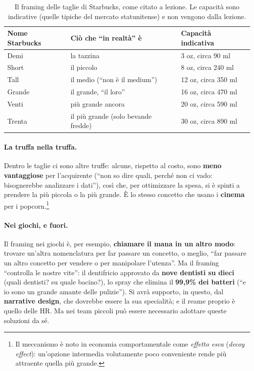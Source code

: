 \begin{table}[htbp]
  \centering
  \caption{Il framing delle taglie di Starbucks, come citato a lezione. Le
  capacità sono indicative (quelle tipiche del mercato statunitense) e non
  vengono dalla lezione.}
  \label{gd10:tab:starbucks}
  \small
  \begin{tabular}{@{}lll@{}}
    \toprule
    \textbf{Nome Starbucks} & \textbf{Ciò che ``in realtà'' è} &
      \textbf{Capacità indicativa} \\
    \midrule
    Demi & la tazzina & 3 oz, circa 90 ml \\
    Short & il piccolo & 8 oz, circa 240 ml \\
    Tall & il medio (``non è il medium'') & 12 oz, circa 350 ml \\
    Grande & il grande, ``il loro'' & 16 oz, circa 470 ml \\
    Venti & più grande ancora & 20 oz, circa 590 ml \\
    Trenta & il più grande (solo bevande fredde) & 30 oz, circa 890 ml \\
    \bottomrule
  \end{tabular}
\end{table}

\paragraph{La truffa nella truffa.} Dentro le taglie ci sono altre truffe:
alcune, rispetto al costo, sono \textbf{meno vantaggiose} per l'acquirente
(``non so dire quali, perché non ci vado: bisognerebbe analizzare i
dati''), così che, per ottimizzare la spesa, si è spinti a prendere la più
piccola o la più grande. È lo stesso concetto che usano i
\textbf{cinema} per i popcorn.\footnote{Il meccanismo è noto in economia
comportamentale come \emph{effetto esca} (\emph{decoy effect}): un'opzione
intermedia volutamente poco conveniente rende più attraente quella più
grande.}

\paragraph{Nei giochi, e fuori.} Il framing nei giochi è, per esempio,
\textbf{chiamare il mana in un altro modo}: trovare un'altra nomenclatura per
far passare un concetto, o meglio, ``far passare un altro concetto per
vendere o per manipolare l'utenza''. Ma il framing ``controlla le nostre
vite'': il dentifricio approvato da \textbf{nove dentisti su dieci} (quali
dentisti? su quale bacino?), lo spray che elimina il \textbf{99,9\% dei
batteri} (``e io sono un grande amante delle pulizie''). Si avrà supporto,
in questo, dal \textbf{narrative design}, che dovrebbe essere la sua
specialità; e il reame proprio è quello delle HR. Ma nei team piccoli può
essere necessario adottare queste soluzioni da sé.

